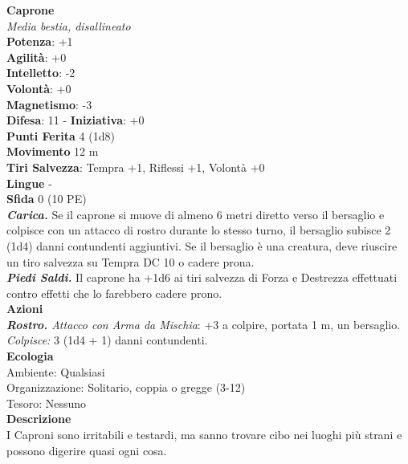\begin{multicols}{2}
\medskip\textbf{Caprone}\\
\emph{Media bestia, disallineato}\\
\textbf{Potenza}: +1\\
\textbf{Agilità}: +0\\
\textbf{Intelletto}: -2\\
\textbf{Volontà}: +0\\
\textbf{Magnetismo}: -3\\
\textbf{Difesa}: 11 - \textbf{Iniziativa}: +0\\
\textbf{Punti Ferita} 4 (1d8)\\
\textbf{Movimento} 12 m\\
\textbf{Tiri Salvezza}: Tempra +1, Riflessi +1, Volontà +0 \\
\textbf{Lingue} -\\
\textbf{Sfida} 0 (10 PE)\smallskip\\
\emph{\textbf{Carica.}} Se il caprone si muove di almeno 6 metri diretto verso il bersaglio e colpisce con un attacco di rostro durante lo stesso turno, il bersaglio subisce 2 (1d4) danni contundenti aggiuntivi. Se il bersaglio è una creatura, deve riuscire un tiro salvezza su Tempra DC 10 o cadere prona.\\
\emph{\textbf{Piedi Saldi.}} Il caprone ha +1d6 ai tiri salvezza di Forza e Destrezza effettuati contro effetti che lo farebbero cadere prono.  \\
\smallskip\textbf{Azioni}\\
\emph{\textbf{Rostro.} Attacco con Arma da Mischia}: +3 a colpire, portata 1 m, un bersaglio.\\
\emph{Colpisce:} 3 (1d4 + 1) danni contundenti.\\
\textbf{Ecologia}\\
Ambiente: Qualsiasi\\
Organizzazione: Solitario, coppia o gregge (3-12)\\
Tesoro: Nessuno\\
\textbf{Descrizione}\\
I Caproni sono irritabili e testardi, ma sanno trovare cibo nei luoghi più strani e possono digerire quasi ogni cosa. \\


\end{multicols}
